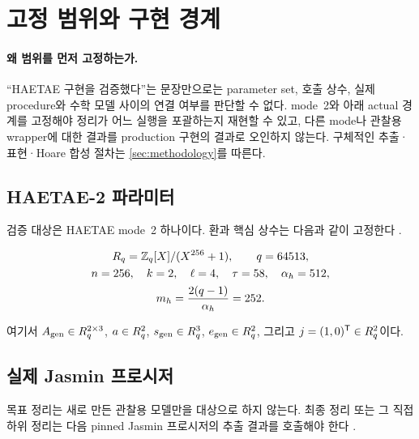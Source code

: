 \section{고정 범위와 구현 경계}
\label{sec:scope}

\paragraph{왜 범위를 먼저 고정하는가.}
``HAETAE 구현을 검증했다''는 문장만으로는 parameter set, 호출 상수, 실제
procedure와 수학 모델 사이의 연결 여부를 판단할 수 없다. mode~2와 아래 actual
경계를 고정해야 정리가 어느 실행을 포괄하는지 재현할 수 있고, 다른 mode나
관찰용 wrapper에 대한 결과를 production 구현의 결과로 오인하지 않는다.
구체적인 추출·표현·Hoare 합성 절차는 \cref{sec:methodology}를 따른다.

\subsection{HAETAE-2 파라미터}

검증 대상은 HAETAE mode~2 하나이다. 환과 핵심 상수는 다음과 같이 고정한다
\cite{haetae-spec}.

\[
\begin{gathered}
  R_q=\mathbb{Z}_q[X]/(X^{256}+1),\qquad q=64513,\\
  n=256,\quad k=2,\quad \ell=4,\quad
  \tau=58,\quad \alpha_h=512,\\
  m_h=\frac{2(q-1)}{\alpha_h}=252.
\end{gathered}
\]

여기서 \(A_{\mathrm{gen}}\in R_q^{2\times3}\),
\(a\in R_q^2\), \(s_{\mathrm{gen}}\in R_q^3\),
\(e_{\mathrm{gen}}\in R_q^2\), 그리고
\(j=(1,0)^{\mathsf T}\in R_q^2\)이다.

\subsection{실제 Jasmin 프로시저}

목표 정리는 새로 만든 관찰용 모델만을 대상으로 하지 않는다. 최종 정리 또는
그 직접 하위 정리는 다음 pinned Jasmin 프로시저의 추출 결과를 호출해야 한다
\cite{pinned-jasmin}.

